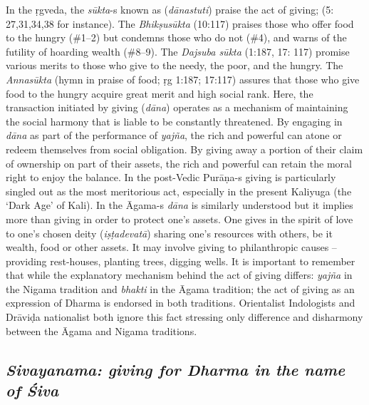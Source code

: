 In the ṛgveda, the \textit{sūkta}-s known as (\textit{dānastuti}) praise the act of giving; (5: 27,31,34,38 for instance). The \textit{Bhikṣusūkta} (10:117) praises those who offer food to the hungry (\#1–2) but condemns those who do not (\#4), and warns of the futility of hoarding wealth (\#8–9). The \textit{Dajsuba sūkta} (1:187, 17: 117) promise various merits to those who give to the needy, the poor, and the hungry. The \textit{Annasūkta} (hymn in praise of food; ṛg 1:187; 17:117) assures that those who give food to the hungry acquire great merit and high social rank. Here, the transaction initiated by giving (\textit{dāna}) operates as a mechanism of maintaining the social harmony that is liable to be constantly threatened. By engaging in \textit{dāna} as part of the performance of \textit{yajña}, the rich and powerful can atone or redeem themselves from social obligation. By giving away a portion of their claim of ownership on part of their assets, the rich and powerful can retain the moral right to enjoy the balance. In the post-Vedic Purāṇa-s giving is particularly singled out as the most meritorious act, especially in the present Kaliyuga (the ‘Dark Age’ of Kali). In the Āgama-s \textit{dāna} is similarly understood but it implies more than giving in order to protect one’s assets. One gives in the spirit of love to one’s chosen deity (\textit{iṣṭadevatā}) sharing one’s resources with others, be it wealth, food or other assets. It may involve giving to philanthropic causes – providing rest-houses, planting trees, digging wells. It is important to remember that while the explanatory mechanism behind the act of giving differs: \textit{yajña} in the Nigama tradition and \textit{bhakti} in the Āgama tradition; the act of giving as an expression of Dharma is endorsed in both traditions. Orientalist Indologists and Drāviḍa nationalist both ignore this fact stressing only difference and disharmony between the Āgama and Nigama traditions.


\subsection*{\textit{Sivayanama: giving for Dharma in the name of Śiva}}

